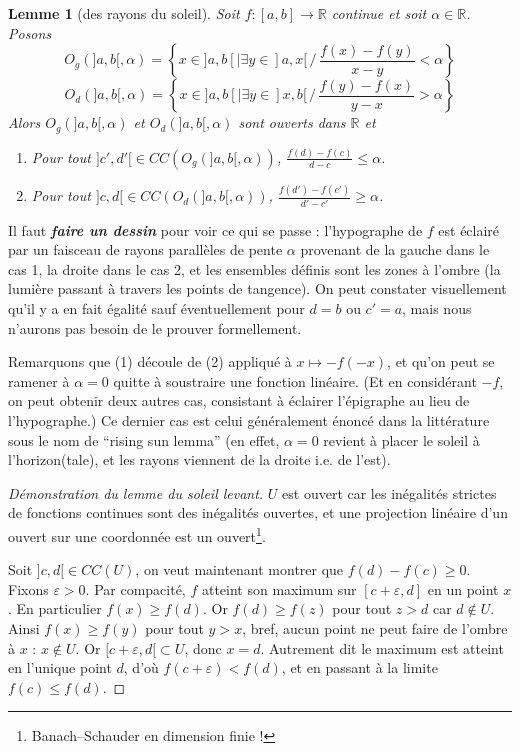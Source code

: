 \documentclass[a4paper, 11pt]{article}
\def\R{\mathbb{R}}
\newtheorem*{lemma}{Lemme}
\begin{document}
\begin{lemma}[des rayons du soleil]
  Soit $f : [a,b] \to \R$ continue et soit $\alpha \in \R$. Posons
  \[ O_g(]a,b[,\alpha)  = \left\{ x \in ]a,b[ | \exists y \in ]a,x[\,/\,
      \frac{f(x)-f(y)}{x-y} < \alpha \right\} \]
  \[ O_d(]a,b[,\alpha) = \left\{ x \in ]a,b[ | \exists y \in ]x,b[\,/\,
      \frac{f(y)-f(x)}{y-x} > \alpha \right\}
  \]
  Alors $O_g(]a,b[,\alpha)$ et $O_d(]a,b[,\alpha)$ sont ouverts dans $\R$ et
  \begin{enumerate}
  \item Pour tout $]c',d'[ \in CC(O_g(]a,b[,\alpha))$,
    $\displaystyle \frac{f(d)-f(c)}{d-c} \leq \alpha$.
  \item Pour tout $]c,d[ \in CC(O_d(]a,b[,\alpha))$,
    $\displaystyle \frac{f(d')-f(c')}{d'-c'} \geq \alpha$.
  \end{enumerate}
\end{lemma}
Il faut \textit{\textbf{faire un dessin}} pour voir ce qui se passe :
l'hypographe de $f$ est éclairé par un faisceau de rayons parallèles de pente
$\alpha$ provenant de la gauche dans le cas 1, la droite dans le cas 2, et les
ensembles définis sont les zones à l'ombre (la lumière passant à travers les
points de tangence). On peut constater visuellement qu'il y a en fait égalité
sauf éventuellement pour $d = b$ ou $c' = a$, mais nous n'aurons pas besoin de
le prouver formellement.

Remarquons que (1) découle de (2) appliqué à $x \mapsto -f(-x)$, et qu'on peut
se ramener à $\alpha = 0$ quitte à soustraire une fonction linéaire. (Et en
considérant $-f$, on peut obtenir deux autres cas, consistant à éclairer
l'épigraphe au lieu de l'hypographe.) Ce dernier cas est celui généralement
énoncé dans la littérature sous le nom de \enquote{rising sun lemma} (en effet,
$\alpha = 0$ revient à placer le soleil à l'horizon(tale), et les rayons
viennent de la droite i.e. de l'est).

\begin{proof}[Démonstration du lemme du soleil levant]
  $U$ est ouvert car les inégalités strictes de fonctions continues sont des
  inégalités ouvertes, et une projection linéaire d'un ouvert sur une coordonnée
  est un ouvert\footnote{Banach--Schauder en dimension finie !}.

  Soit $]c,d[ \in CC(U)$, on veut maintenant montrer que $f(d) - f(c) \geq 0$.
  Fixons $\varepsilon > 0$. Par compacité, $f$ atteint son maximum sur
  $[c+\varepsilon, d]$ en un point $x$. En particulier $f(x) \geq f(d)$. Or
  $f(d) \geq f(z)$ pour tout $z > d$ car $d \not\in U$. Ainsi $f(x) \geq f(y)$
  pour tout $y > x$, bref, aucun point ne peut faire de l'ombre à $x$ : $x
  \not\in U$. Or $[c+\varepsilon,d[ \subset U$, donc $x = d$. Autrement dit le
  maximum est atteint en l'unique point $d$, d'où $f(c+\varepsilon) < f(d)$, et
  en passant à la limite $f(c) \leq f(d)$.
\end{proof}
\end{document}

